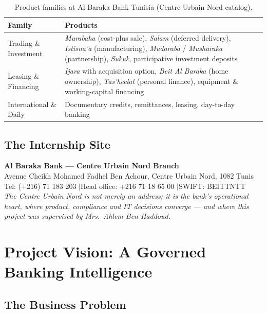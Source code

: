 \documentclass[a4paper,12pt]{report}
\begin{document}
\begin{table}[H]
\centering\small
\begin{tabular}{p{4.2cm}p{10.0cm}}
\toprule
\textbf{Family} & \textbf{Products} \\
\midrule
Trading \& Investment & \textit{Murabaha} (cost-plus sale), \textit{Salam} (deferred delivery), \textit{Istisna'a} (manufacturing), \textit{Mudaraba} / \textit{Musharaka} (partnership), \textit{Sukuk}, participative investment deposits \\
Leasing \& Financing & \textit{Ijara} with acquisition option, \textit{Beit Al Baraka} (home ownership), \textit{Tas'heelat} (personal finance), equipment \& working-capital financing \\
International \& Daily & Documentary credits, remittances, leasing, day-to-day banking \\
\bottomrule
\end{tabular}
\caption{Product families at Al Baraka Bank Tunisia (Centre Urbain Nord catalog).}
\end{table}

\section{The Internship Site}

\begin{tcolorbox}[colback=softGray, colframe=abarakaRed!28, boxrule=0.5pt, arc=3pt, left=6pt, right=6pt, top=5pt, bottom=5pt]
\small
\textbf{\color{abarakaRed}Al Baraka Bank --- Centre Urbain Nord Branch}\\
\small Avenue Cheikh Mohamed Fadhel Ben Achour, Centre Urbain Nord, 1082 Tunis\\
Tel: (+216) 71 183 203 \quad$\vert$\quad Head office: +216 71 18 65 00 \quad$\vert$\quad SWIFT: BEITTNTT\\[2pt]
\normalsize\small
\textit{The Centre Urbain Nord is not merely an address; it is the bank's operational heart, where product, compliance and IT decisions converge --- and where this project was supervised by Mrs.\ Ahlem Ben Haddoud.}
\end{tcolorbox}

\chapter{Project Vision: A Governed Banking Intelligence}

\section{The Business Problem}
\end{document}
